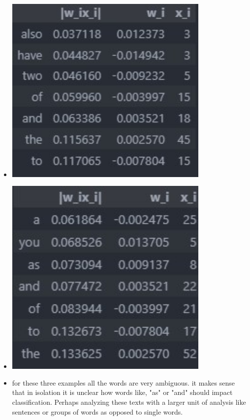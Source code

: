 \documentclass{article}
\theoremstyle{plain}
\theoremstyle{definition}
\begin{document}
\begin{enumerate}
\begin{itemize}
\item \includegraphics[width=10cm]{homework/homework_3/immages/question_14_2.png.jpg}
\item \includegraphics[width=10cm]{homework/homework_3/immages/question_14_3.png.jpg}
    \item for these three examples all the words are very ambiguous. it makes sense that in isolation it is unclear how words like, "as" or "and" should impact classification. Perhaps analyzing these texts with a larger unit of analysis like sentences or groups of words as opposed to single words.
\end{itemize}


\setcounter{saveenum}{\value{enumi}}
\end{enumerate}
\end{document}
